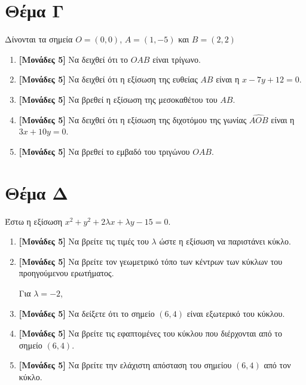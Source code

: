 \documentclass[12pt]{article}
\begin{document}
\section*{Θέμα Γ}
  \noindent
  Δίνονται τα σημεία $Ο=(0,0)$, $Α=(1,-5)$ και $Β=(2,2)$
  \begin{enumerate}
    \item \textbf{[Μονάδες 5]} Να δειχθεί ότι το $ΟΑΒ$ είναι τρίγωνο.
    \item \textbf{[Μονάδες 5]} Να δειχθεί ότι η εξίσωση της ευθείας $ΑΒ$ είναι η $x-7y+12=0$.
    \item \textbf{[Μονάδες 5]} Να βρεθεί η εξίσωση της μεσοκαθέτου του $ΑΒ$.
    \item \textbf{[Μονάδες 5]} Να δειχθεί ότι η εξίσωση της διχοτόμου της γωνίας $\widehat{ΑΟΒ}$ είναι η $3x+10y=0$.
    \item \textbf{[Μονάδες 5]} Να βρεθεί το εμβαδό του τριγώνου $ΟΑΒ$.

  \end{enumerate}

\section*{Θέμα Δ}
  \noindent
  Έστω η εξίσωση $ x^2+y^2+2λx+λy-15=0 $.
  \begin{enumerate}
    \item \textbf{[Μονάδες 5]} Να βρείτε τις τιμές του $λ$ ώστε η εξίσωση να παριστάνει κύκλο.
    \item \textbf{[Μονάδες 5]} Να βρείτε τον γεωμετρικό τόπο των κέντρων των κύκλων του προηγούμενου ερωτήματος.

    Για $λ=-2$,
    \item \textbf{[Μονάδες 5]} Να δείξετε ότι το σημείο $(6,4)$ είναι εξωτερικό του κύκλου.
    \item \textbf{[Μονάδες 5]} Να βρείτε τις εφαπτομένες του κύκλου που διέρχονται από το σημείο $(6,4)$.
    \item \textbf{[Μονάδες 5]} Να βρείτε την ελάχιστη απόσταση του σημείου $(6,4)$ από τον κύκλο.

  \end{enumerate}

\vspace{3\baselineskip}
\end{document}
